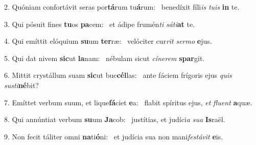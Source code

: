 2. Quóniam confortávit seras por\textbf{tá}rum tu\textbf{á}rum: \ast\  benedíxit fíli\textit{is} \textit{tu}\textit{is} \textbf{in} te.\

3. Qui pósuit fines \textbf{tu}os \textbf{pa}cem: \ast\  et ádipe frumén\textit{ti} \textit{sá}\textit{ti}\textbf{at} te.\

4. Qui emíttit elóquium \textbf{su}um \textbf{ter}ræ: \ast\  velóciter cur\textit{rit} \textit{ser}\textit{mo} \textbf{e}jus.\

5. Qui dat nivem \textbf{sic}ut \textbf{la}nam: \ast\  nébulam sicut \textit{cí}\textit{ne}\textit{rem} \textbf{spar}git.\

6. Mittit crystállum suam \textbf{sic}ut buc\textbf{cél}las: \ast\  ante fáciem frígoris ejus \textit{quis} \textit{sus}\textit{ti}\textbf{né}bit?\

7. Emíttet verbum suum, et lique\textbf{fá}ciet \textbf{e}a: \ast\  flabit spíritus ejus, \textit{et} \textit{flu}\textit{ent} \textbf{a}quæ.\

8. Qui annúntiat verbum \textbf{su}um \textbf{Ja}cob: \ast\  justítias, et judíci\textit{a} \textit{su}\textit{a} \textbf{Is}raël.\

9. Non fecit táliter omni \textbf{na}ti\textbf{ó}ni: \ast\  et judícia sua non mani\textit{fes}\textit{tá}\textit{vit} \textbf{e}is.\

